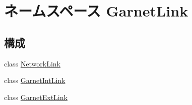 \hypertarget{namespaceGarnetLink}{
\section{ネームスペース GarnetLink}
\label{namespaceGarnetLink}
}
\subsection*{構成}
\begin{DoxyCompactItemize}
\item 
class \hyperlink{classGarnetLink_1_1NetworkLink}{NetworkLink}
\item 
class \hyperlink{classGarnetLink_1_1GarnetIntLink}{GarnetIntLink}
\item 
class \hyperlink{classGarnetLink_1_1GarnetExtLink}{GarnetExtLink}
\end{DoxyCompactItemize}
